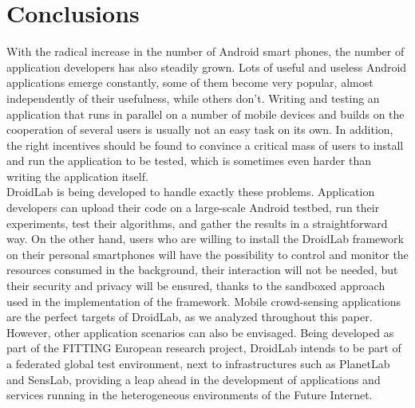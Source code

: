 \documentclass[conference,letterpaper]{IEEEtran}
\begin{document}
\section{Conclusions}
\label{sec:conclusion_and_future_work}
With the radical increase in the number of Android smart phones, the number of application developers has also steadily grown. Lots of useful and useless Android applications emerge constantly, some of them become very popular, almost independently of their usefulness, while others don't. Writing and testing an application that runs in parallel on a number of mobile devices and builds on the cooperation of several users is usually not an easy task on its own. In addition, the right incentives should be found to convince a critical mass of users to install and run the application to be tested, which is sometimes even harder than writing the application itself. \\
\indent DroidLab is being developed to handle exactly these problems. Application developers can upload their code on a large-scale Android testbed, run their experiments, test their algorithms, and gather the results in a straightforward way. On the other hand, users who are willing to install the DroidLab framework on their personal smartphones will have the possibility to control and monitor the resources consumed in the background, their interaction will not be needed, but their security and privacy will be ensured, thanks to the sandboxed approach used in the implementation of the framework.  Mobile crowd-sensing applications are the perfect targets of DroidLab, as we analyzed throughout this paper. However, other application scenarios can also be envisaged. Being developed as part of the FITTING European research project, DroidLab intends to be part of a federated global test environment, next to infrastructures such as PlanetLab and SensLab, providing a leap ahead in the development of applications and services running in the heterogeneous environments of the Future Internet.       


\end{document}
